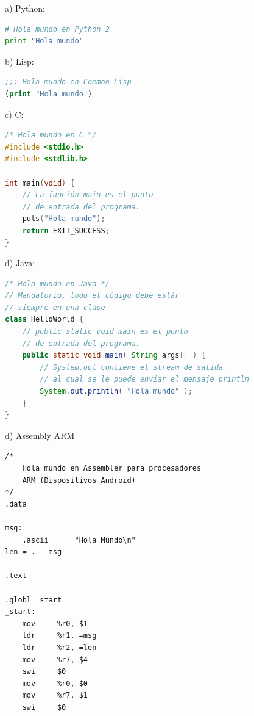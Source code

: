 \vspace{0.5cm}
\noindent a) Python:
\begin{lstlisting}[language=python]
# Hola mundo en Python 2
print "Hola mundo"
\end{lstlisting}

\vspace{0.5cm}
\noindent b) Lisp:
\begin{lstlisting}[language=Lisp]
;;; Hola mundo en Common Lisp
(print "Hola mundo")
\end{lstlisting}

\vspace{0.5cm}
\noindent c) C:
\begin{lstlisting}[language=C]
/* Hola mundo en C */
#include <stdio.h>
#include <stdlib.h>

int main(void) {
    // La función main es el punto
    // de entrada del programa.
    puts("Hola mundo");
    return EXIT_SUCCESS;
}
\end{lstlisting}

\vspace{0.5cm}
\noindent d) Java:
\begin{lstlisting}[language=Java]
/* Hola mundo en Java */
// Mandatorio, todo el código debe estár
// siempre en una clase
class HelloWorld {
    // public static void main es el punto
    // de entrada del programa.
    public static void main( String args[] ) {
        // System.out contiene el stream de salida
        // al cual se le puede enviar el mensaje println
        System.out.println( "Hola mundo" );
    }
}

\end{lstlisting}

\vspace{0.5cm}
\noindent d) Assembly ARM
\begin{lstlisting}[language={[x86masm]Assembler},morekeywords={ldr,swi},morecomment={[s]{/*}{*/}}]
/*
    Hola mundo en Assembler para procesadores
    ARM (Dispositivos Android)
*/
.data

msg:
    .ascii      "Hola Mundo\n"
len = . - msg

.text

.globl _start
_start:
    mov     %r0, $1
    ldr     %r1, =msg
    ldr     %r2, =len
    mov     %r7, $4
    swi     $0
    mov     %r0, $0
    mov     %r7, $1
    swi     $0
\end{lstlisting}


